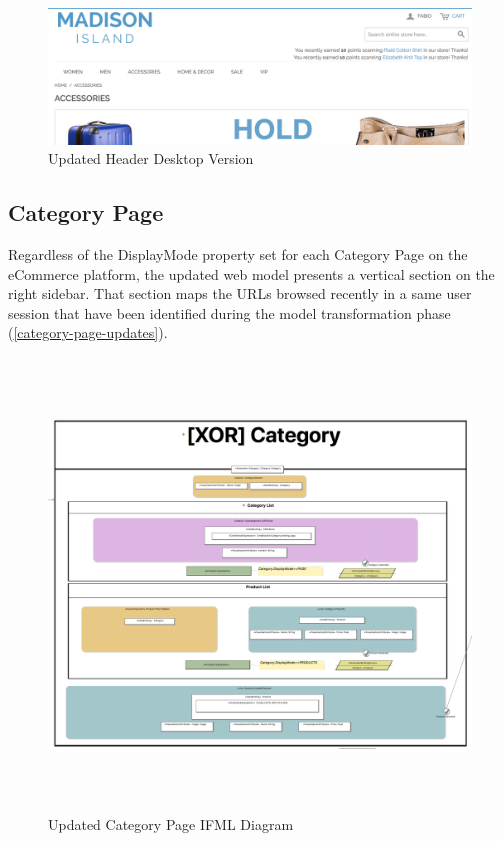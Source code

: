 \begin{figure}[H]
  \centering
    \includegraphics[width=14cm]{images/diagrams/after/desktop-header.png}
  \caption{Updated Header Desktop Version}
  \label{fig:desktop-after-header}
\end{figure}
\vspace{0.5cm}

\newpage
\subsection{Category Page}

Regardless of the DisplayMode property set for each Category Page on the eCommerce platform, the updated web model presents a vertical section on the right sidebar. That section maps the URLs browsed recently in a same user session that have been identified during the model transformation phase (\ref{category-page-updates}).

\vspace{0.5cm}
\begin{figure}[H]
  \centering
    \includegraphics[height=12cm]{images/diagrams/after/ifml-category.png}
  \caption{Updated Category Page IFML Diagram}
  \label{fig:ifml-after-category}
\end{figure}


